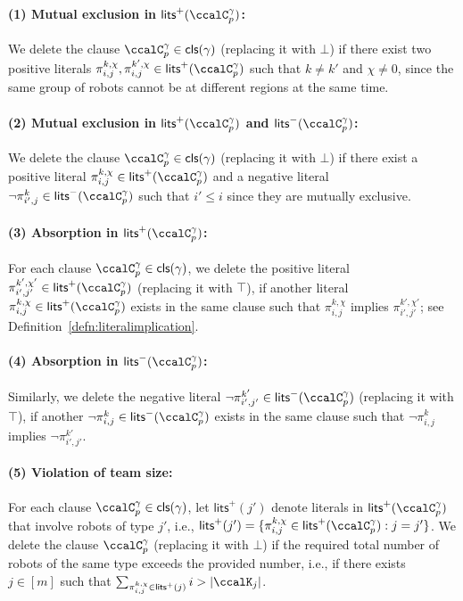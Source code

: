 \documentclass[Afour,sageh,times]{sagej}
\newcommand{\clause}[1]{\mathsf{cls}(#1)}
\newcommand{\cp}[2]{\ccalC_{#1}^{#2}}
\renewcommand{\ap}[3]{\mathcal{\pi}_{{#1},{#2}}^{#3}}
\begin{document}
\paragraph{(1) Mutual exclusion in $\mathsf{lits}^+(\cp{p}{\gamma})$:}\label{prune:exclusion1} We delete the clause $\cp{p}{\gamma} \in \mathsf{cls}(\gamma)$ (replacing it with $\bot$) if there exist two positive literals $\ap{i}{j}{k,\chi}, \ap{i}{j}{k',\chi} \in \mathsf{lits}^+(\cp{p}{\gamma})$ such that $k\not= k'$ and $\chi\not=0$, since the same group of robots cannot be at different regions at the same time.
 \paragraph{(2) Mutual exclusion in $\mathsf{lits}^+(\cp{p}{\gamma})$  and $\mathsf{lits}^-(\cp{p}{\gamma})$:} \label{prune:exclusion2} We delete the clause $\cp{p}{\gamma} \in \mathsf{cls}(\gamma)$ (replacing it with $\bot$) if there exist a positive literal $\ap{i}{j}{k,\chi} \in \mathsf{lits}^+(\cp{p}{\gamma})$ and a negative literal $\neg \ap{i'}{j}{k} \in \mathsf{lits}^-(\cp{p}{\gamma})$ such that $i' \leq i$ since they are mutually  exclusive.
 \paragraph{(3) Absorption in $\mathsf{lits}^+(\cp{p}{\gamma})$:} \label{prune:absorption1} For each clause $\cp{p}{\gamma} \in \clause{\gamma}$, we delete the positive literal $\ap{i'}{j'}{k',\chi'} \in \mathsf{lits}^+(\cp{p}{\gamma})$ (replacing it with $\top$), if another literal $\ap{i}{j}{k,\chi} \in \mathsf{lits}^+(\cp{p}{\gamma})$ exists in the same clause such that $\ap{i}{j}{k,\chi}$ implies $\ap{i'}{j'}{k',\chi'}$; see Definition~\ref{defn:literalimplication}.
 \paragraph{(4) Absorption in $\mathsf{lits}^-(\cp{p}{\gamma})$:} \label{prune:absorption2} Similarly, we delete the negative literal $\neg \ap{i'}{j'}{k'} \in \mathsf{lits}^-(\cp{p}{\gamma})$ (replacing it with $\top$), if another $\neg \ap{i}{j}{k} \in \mathsf{lits}^-(\cp{p}{\gamma})$ exists in the same clause such that $\neg \ap{i}{j}{k}$ implies $\neg \ap{i'}{j'}{k'}$.


       \paragraph{(5) Violation of team size:} \label{prune:violation1}  For each clause $\cp{p}{\gamma} \in \clause{\gamma}$, let $\mathsf{lits}^+(j')$ denote literals in $\mathsf{lits}^+(\cp{p}{\gamma})$ that involve robots of type $j'$, i.e., $\mathsf{lits}^+(j') = \{\ap{i}{j}{k,\chi} \in \mathsf{lits}^+(\ccalC_p^\gamma): j = j'\}$. We delete the clause $\cp{p}{\gamma}$ (replacing it with $\bot$) if the required total number of robots of the same type exceeds the provided number, i.e., if there exists $j\in[m]$ such that $ \sum_{\ap{i}{j}{k,\chi}\in\mathsf{lits}^+(j)}   i > |\ccalK_{j}|$.
\end{document}
